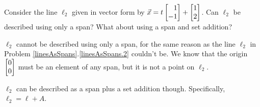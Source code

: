 \begin{parts}
\begin{solution}
			\end{solution}
		\item Consider the line $\ell_2$ given in vector form by $\vec x=t\mat{1\\-1}+\mat{1\\2}$.
			Can $\ell_2$ be described using only a span? What about using a span
			and set addition?
			\begin{solution}
				$\ell_2$ cannot be described using only a span, for the same reason
				as the line $\ell_2$ in Problem \ref{linesAsSpans}.\ref{linesAsSpans.2}
				couldn't be. We know that the origin $\mat{0\\0}$ must be an element
				of any span, but it is not a point on $\ell_2$.

				$\ell_2$ can be described as a span plus a set addition though.
				Specifically, $\ell_2=\ell + A$.
			\end{solution}
	\end{parts}

	\begin{bookonly}\begin{center}\doublegrid\end{center}\end{bookonly}



